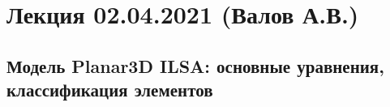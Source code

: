 \documentclass[main.tex]{subfiles}
\begin{document}

\section{Лекция 02.04.2021 (Валов А.В.)}

\subsection{Модель Planar3D ILSA: основные уравнения, классификация элементов}
\end{document}
